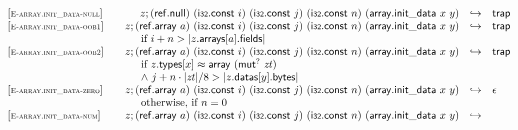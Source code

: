 \vspace{1ex}

$$
\begin{array}[t]{@{}lrcl@{}l@{}}
{[\textsc{\scriptsize E{-}array.init\_data{-}null}]} \quad & z ; (\mathsf{ref{.}null})~(\mathsf{i{\scriptstyle 32}}{.}\mathsf{const}~i)~(\mathsf{i{\scriptstyle 32}}{.}\mathsf{const}~j)~(\mathsf{i{\scriptstyle 32}}{.}\mathsf{const}~n)~(\mathsf{array{.}init\_data}~x~y) & \hookrightarrow & \mathsf{trap} \\
{[\textsc{\scriptsize E{-}array.init\_data{-}oob1}]} \quad & z ; (\mathsf{ref{.}array}~a)~(\mathsf{i{\scriptstyle 32}}{.}\mathsf{const}~i)~(\mathsf{i{\scriptstyle 32}}{.}\mathsf{const}~j)~(\mathsf{i{\scriptstyle 32}}{.}\mathsf{const}~n)~(\mathsf{array{.}init\_data}~x~y) & \hookrightarrow & \mathsf{trap} &  \\
& \multicolumn{4}{@{}l@{}}{\quad
\quad \mbox{if}~ i + n > {|z{.}\mathsf{arrays}{}[a]{.}\mathsf{fields}|}
} \\
{[\textsc{\scriptsize E{-}array.init\_data{-}oob2}]} \quad & z ; (\mathsf{ref{.}array}~a)~(\mathsf{i{\scriptstyle 32}}{.}\mathsf{const}~i)~(\mathsf{i{\scriptstyle 32}}{.}\mathsf{const}~j)~(\mathsf{i{\scriptstyle 32}}{.}\mathsf{const}~n)~(\mathsf{array{.}init\_data}~x~y) & \hookrightarrow & \mathsf{trap} &  \\
& \multicolumn{4}{@{}l@{}}{\quad
\quad
\begin{array}[t]{@{}l@{}}
\mbox{if}~ z{.}\mathsf{types}{}[x] \approx \mathsf{array}~({\mathsf{mut}^?}~{\mathit{zt}}) \\
{\land}~ j + n \cdot {|{\mathit{zt}}|} / 8 > {|z{.}\mathsf{datas}{}[y]{.}\mathsf{bytes}|} \\
\end{array}
} \\
{[\textsc{\scriptsize E{-}array.init\_data{-}zero}]} \quad & z ; (\mathsf{ref{.}array}~a)~(\mathsf{i{\scriptstyle 32}}{.}\mathsf{const}~i)~(\mathsf{i{\scriptstyle 32}}{.}\mathsf{const}~j)~(\mathsf{i{\scriptstyle 32}}{.}\mathsf{const}~n)~(\mathsf{array{.}init\_data}~x~y) & \hookrightarrow & \epsilon &  \\
& \multicolumn{4}{@{}l@{}}{\quad
\quad \mbox{otherwise, if}~ n = 0
} \\
{[\textsc{\scriptsize E{-}array.init\_data{-}num}]} \quad & z ; (\mathsf{ref{.}array}~a)~(\mathsf{i{\scriptstyle 32}}{.}\mathsf{const}~i)~(\mathsf{i{\scriptstyle 32}}{.}\mathsf{const}~j)~(\mathsf{i{\scriptstyle 32}}{.}\mathsf{const}~n)~(\mathsf{array{.}init\_data}~x~y) & \hookrightarrow & & \\

\end{array}$$
